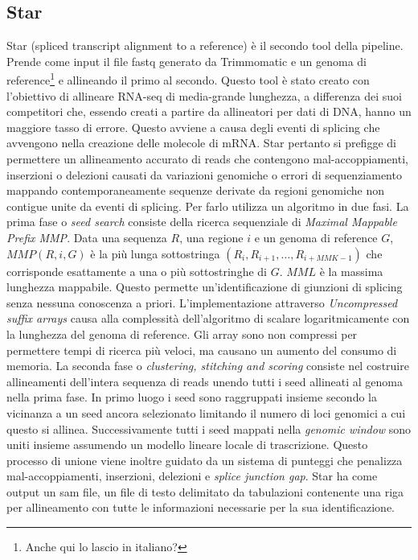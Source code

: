 	\subsection{Star}
	\label{subsec:star}
	Star (spliced transcript alignment to a reference) \cite{star} \`e il secondo tool della pipeline.
	Prende come input il file fastq generato da Trimmomatic e un genoma di reference\footnote{Anche qui lo lascio in italiano?} e allineando il primo al secondo.
	Questo tool \`e stato creato con l'obiettivo di allineare RNA-seq di media-grande lunghezza, a differenza dei suoi competitori che, essendo creati a partire da allineatori per dati di DNA, hanno un maggiore tasso di errore.
	Questo avviene a causa degli eventi di splicing che avvengono nella creazione delle molecole di mRNA.
	Star pertanto si prefigge di permettere un allineamento accurato di reads che contengono mal-accoppiamenti, inserzioni o delezioni causati da variazioni genomiche o errori di sequenziamento mappando contemporaneamente sequenze derivate da regioni genomiche non contigue unite da eventi di splicing.
	Per farlo utilizza un algoritmo in due fasi.
	La prima fase o \emph{seed search} consiste della ricerca sequenziale di \emph{Maximal Mappable Prefix MMP}.
	Data una sequenza $R$, una regione $i$ e un genoma di reference $G$, $MMP(R, i, G)$ \`e la pi\`u lunga sottostringa $(R_i, R_{i+1}, \dots, R_{i+MMK-1})$ che corrisponde esattamente a una o pi\`u sottostringhe di $G$.
	$MML$ \`e la massima lunghezza mappabile.
	Questo permette un'identificazione di giunzioni di splicing senza nessuna conoscenza a priori.
	L'implementazione attraverso \emph{Uncompressed suffix arrays} causa alla complessit\`a dell'algoritmo di scalare logaritmicamente con la lunghezza del genoma di reference.
	Gli array sono non compressi per permettere tempi di ricerca pi\`u veloci, ma causano un aumento del consumo di memoria.
	La seconda fase o \emph{clustering, stitching and scoring} consiste nel costruire allineamenti dell'intera sequenza di reads unendo tutti i seed allineati al genoma nella prima fase.
	In primo luogo i seed sono raggruppati insieme secondo la vicinanza a un seed ancora selezionato limitando il numero di loci genomici a cui questo si allinea.
	Successivamente tutti i seed mappati nella \emph{genomic window} sono uniti insieme assumendo un modello lineare locale di trascrizione.
	Questo processo di unione viene inoltre guidato da un sistema di punteggi che penalizza mal-accoppiamenti, inserzioni, delezioni e \emph{splice junction gap}.
	Star ha come output un sam file, un file di testo delimitato da tabulazioni contenente una riga per allineamento con tutte le informazioni necessarie per la sua identificazione.

